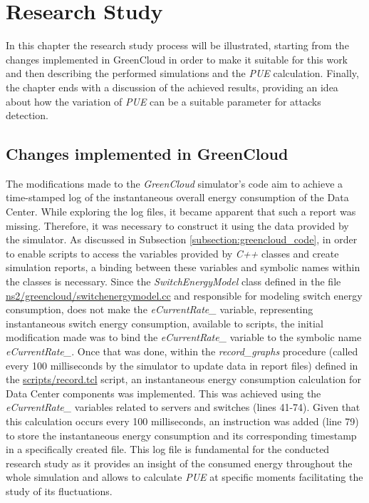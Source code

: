 \chapter{Research Study} \label{chapter:research_study}

\begin{citazione}
In this chapter the research study process will be illustrated, starting from the changes implemented in GreenCloud in order to make it suitable for this work and then describing the performed simulations and the \emph{PUE} calculation. Finally, the chapter ends with a discussion of the achieved results, providing an idea about how the variation of \emph{PUE} can be a suitable parameter for attacks detection.
\end{citazione}
\newpage

\section{Changes implemented in GreenCloud}\label{section:greencloud_mod}
The modifications made to the \emph{GreenCloud} simulator's code aim to achieve a time-stamped log of the instantaneous overall energy consumption of the Data Center. While exploring the log files, it became apparent that such a report was missing. Therefore, it was necessary to construct it using the data provided by the simulator. As discussed in Subsection \ref{subsection:greencloud_code}, in order to enable scripts to access the variables provided by \emph{C++} classes and create simulation reports, a binding between these variables and symbolic names within the classes is necessary. Since the \emph{SwitchEnergyModel} class defined in the file \href{https://github.com/vincenzo-emanuele/masters-degree-thesis/blob/main/greencloud_modified_src/ns2/greencloud/switchenergymodel.cc}{ns2/greencloud/switchenergymodel.cc} and responsible for modeling switch energy consumption, does not make the \emph{eCurrentRate\_} variable, representing instantaneous switch energy consumption, available to scripts, the initial modification made was to bind the \emph{eCurrentRate\_} variable to the symbolic name \emph{eCurrentRate\_}. Once that was done, within the \emph{record\_graphs} procedure (called every 100 milliseconds by the simulator to update data in report files) defined in the \href{https://github.com/vincenzo-emanuele/masters-degree-thesis/blob/main/greencloud\_modified\_src/scripts/record.tcl}{scripts/record.tcl} script, an instantaneous energy consumption calculation for Data Center components was implemented. This was achieved using the \emph{eCurrentRate\_} variables related to servers and switches (lines 41-74). Given that this calculation occurs every 100 milliseconds, an instruction was added (line 79) to store the instantaneous energy consumption and its corresponding timestamp in a specifically created file. This log file is fundamental for the conducted research study as it provides an insight of the consumed energy throughout the whole simulation and allows to calculate \emph{PUE} at specific moments facilitating the study of its fluctuations.

